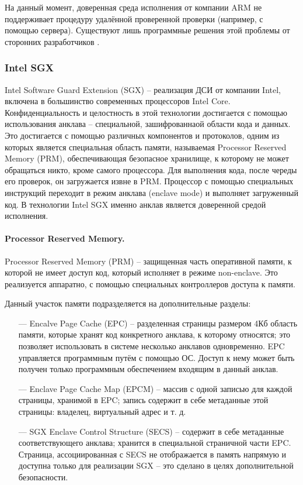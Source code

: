 На данный момент, доверенная среда исполнения от компании ARM не поддерживает процедуру удалённой проверенной проверки (например, с помощью сервера). Существуют лишь программные решения этой проблемы от сторонних разработчиков \cite{comparsion-arm-intel}.


\subsubsection{Intel SGX}

Intel Software Guard Extension (SGX) -- реализация ДСИ от компании Intel, включена в большинство современных процессоров Intel Core. Конфиденциальность и целостность в этой технологии достигается с помощью использования анклава -- специальной, зашифрованнаой области кода и данных. Это достигается с помощью различных компонентов и протоколов, одним из которых является специальная область памяти, называемая Processor Reserved Memory (PRM), обеспечивающая безопасное хранилище, к которому не может обращаться никто, кроме самого процессора. Для выполнения кода, после череды его проверок, он загружается извне в PRM. Процессор с помощью специальных инструкций переходит в режим анклава (enclave mode) и выполняет загруженный код. В технологии Intel SGX именно анклав является доверенной средой исполнения.

\paragraph{Processor Reserved Memory.}

Processor Reserved Memory (PRM) -- защищенная часть оперативной памяти, к которой не имеет доступ код, который исполняет в режиме non-enclave. Это реализуется аппаратно, с помощью специальных контроллеров доступа к памяти. 

Данный участок памяти подразделяется на дополнительные разделы:

\begin{itemize}
	\item [---] Encalve Page Cache (EPC) -- разделенная страницы размером 4Кб область памяти, которые хранят код конкретного анклава, к которому относятся; это позволяет использовать в системе несколько анклавов одновременно. EPC управляется программным путём с помощью ОС. Доступ к нему может быть получен только программным обеспечением входящим в данный анклав.
	\item [---] Enclave Page Cache Map (EPCM) -- массив с одной записью для каждой страницы, хранимой в EPC; запись содержит в себе метаданные этой страницы: владелец, виртуальный адрес и т. д.
	\item [---] SGX Enclave Control Structure (SECS) -- содержит в себе метаданные соответствующего анклава; хранится в специальной страничной части EPC. Страница, ассоциированная с SECS не отображается в память напрямую и доступна только для реализации SGX -- это сделано в целях дополнительной безопасности.
\end{itemize}

